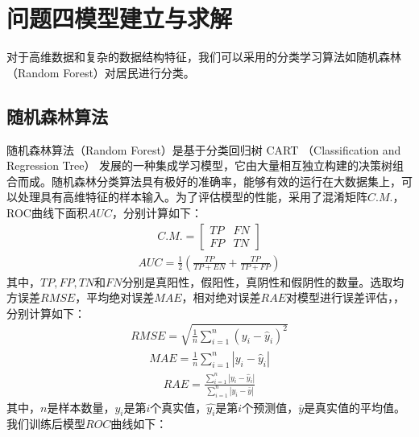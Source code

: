 \documentclass{cumcmthesis}
\begin{document}
\section{问题四模型建立与求解}
对于高维数据和复杂的数据结构特征，我们可以采用的分类学习算法如随机森林（Random Forest）对居民进行分类。
\subsection{随机森林算法}
随机森林算法（Random Forest）是基于分类回归树 CART （Classification and Regression Tree） 发展的一种集成学习模型，它由大量相互独立构建的决策树组合而成。随机森林分类算法具有极好的准确率，能够有效的运行在大数据集上，可以处理具有高维特征的样本输入。为了评估模型的性能，采用了混淆矩阵$C.M.$，ROC曲线下面积$AUC$，分别计算如下：
\begin{eqnarray}
C.M.=\begin{bmatrix}
  TP&FN \\
  FP&TN
\end{bmatrix}
\end{eqnarray}
\begin{eqnarray}
AUC=\frac{1}{2}(\frac{TP}{TP+EN}+\frac{TP}{TP+FP})
\end{eqnarray}
其中，$TP,FP,TN$和$FN$分别是真阳性，假阳性，真阴性和假阴性的数量。选取均方误差$RMSE$，平均绝对误差$MAE$，相对绝对误差$RAE$对模型进行误差评估，，分别计算如下：
\begin{eqnarray}
RMSE = \sqrt{\frac{1}{n} \sum_{i=1}^{n} (y_i - \hat{y}_i)^2}
\end{eqnarray}
\begin{eqnarray}
MAE = \frac{1}{n} \sum_{i=1}^{n} |y_i - \hat{y}_i|
\end{eqnarray}
\begin{eqnarray}
RAE = \frac{\sum_{i=1}^{n} |y_i - \hat{y}_i|}{\sum_{i=1}^{n} |y_i - \bar{y}|}
\end{eqnarray}
其中，$n$是样本数量，$y_i$是第$i$个真实值，$\hat{y_i}$是第$i$个预测值，$\bar{y}$是真实值的平均值。我们训练后模型$ROC$曲线如下：
\end{document}
